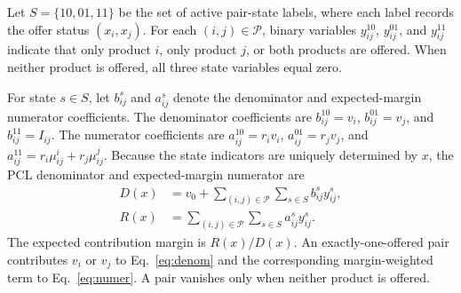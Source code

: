 \documentclass[10pt]{article}
\begin{document}
Let $S=\{10,01,11\}$ be the set of active pair-state labels, where each label records the offer status $(x_i,x_j)$. For each $(i,j)\in\mathcal P$, binary variables $y_{ij}^{10}$, $y_{ij}^{01}$, and $y_{ij}^{11}$ indicate that only product $i$, only product $j$, or both products are offered. When neither product is offered, all three state variables equal zero.

For state $s\in S$, let $b_{ij}^s$ and $a_{ij}^s$ denote the denominator and expected-margin numerator coefficients. The denominator coefficients are $b_{ij}^{10}=v_i$, $b_{ij}^{01}=v_j$, and $b_{ij}^{11}=I_{ij}$. The numerator coefficients are $a_{ij}^{10}=r_iv_i$, $a_{ij}^{01}=r_jv_j$, and $a_{ij}^{11}=r_i\mu_{ij}^i+r_j\mu_{ij}^j$.
Because the state indicators are uniquely determined by $x$, the PCL denominator and expected-margin numerator are
\begin{align}
D(x)
&=
v_0+
\sum_{(i,j)\in\mathcal P}
\sum_{s\in S}
b_{ij}^s y_{ij}^s,
\label{eq:denom}\\
R(x)
&=
\sum_{(i,j)\in\mathcal P}
\sum_{s\in S}
a_{ij}^s y_{ij}^s.
\label{eq:numer}
\end{align}
The expected contribution margin is $R(x)/D(x)$. An exactly-one-offered pair contributes $v_i$ or $v_j$ to Eq.~\eqref{eq:denom} and the corresponding margin-weighted term to Eq.~\eqref{eq:numer}. A pair vanishes only when neither product is offered.
\end{document}
